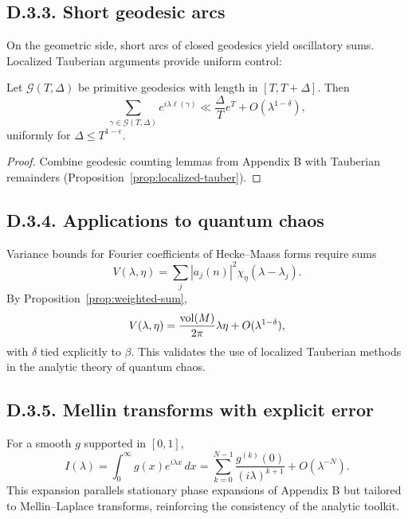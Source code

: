 \medskip

\subsection*{D.3.3. Short geodesic arcs}

On the geometric side, short arcs of closed geodesics yield oscillatory sums.  
Localized Tauberian arguments provide uniform control:

\begin{lemma}\label{lem:arc}
Let $\mathcal G(T,\Delta)$ be primitive geodesics with length in $[T,T+\Delta]$. Then
\[
\sum_{\gamma\in \mathcal G(T,\Delta)} e^{i\lambda \ell(\gamma)}
\ll \frac{\Delta}{T}e^T + O(\lambda^{1-\delta}),
\]
uniformly for $\Delta\le T^{1-\epsilon}$.  
\end{lemma}

\begin{proof}
Combine geodesic counting lemmas from Appendix B with Tauberian remainders (Proposition~\ref{prop:localized-tauber}).  
\end{proof}

\medskip

\subsection*{D.3.4. Applications to quantum chaos}

Variance bounds for Fourier coefficients of Hecke–Maass forms require sums
\[
V(\lambda,\eta) = \sum_j |a_j(n)|^2 \chi_\eta(\lambda-\lambda_j).
\]
By Proposition~\ref{prop:weighted-sum},
\[
V(\lambda,\eta) = \frac{\operatorname{vol}(M)}{2\pi}\lambda\eta + O(\lambda^{1-\delta}),
\]
with $\delta$ tied explicitly to $\beta$.  
This validates the use of localized Tauberian methods in the analytic theory of quantum chaos.

\medskip

\subsection*{D.3.5. Mellin transforms with explicit error}

For a smooth $g$ supported in $[0,1]$,
\[
I(\lambda) = \int_0^\infty g(x)e^{i\lambda x}\,dx
= \sum_{k=0}^{N-1} \frac{g^{(k)}(0)}{(i\lambda)^{k+1}} + O(\lambda^{-N}).
\]
This expansion parallels stationary phase expansions of Appendix B but tailored to Mellin--Laplace transforms, reinforcing the consistency of the analytic toolkit.

